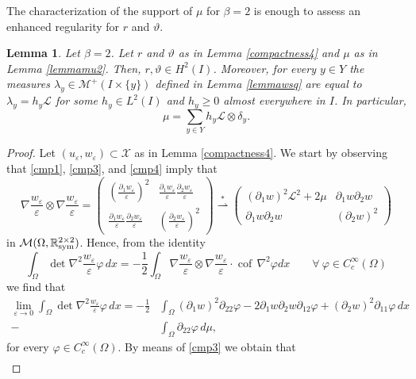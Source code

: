 \documentclass[a4, 11pt, reqno, final]{amsart}
\newcommand{\calL}{\mathcal{L}}
\newcommand{\calM}{\mathcal{M}}
\newcommand{\calX}{\mathcal{X}}
\newcommand\e{\varepsilon}
\newcommand\weakstar{\stackrel{\ast }{\rightharpoonup}}  %
\theoremstyle{plain}%
\newtheorem{lemma}[theorem]{Lemma}
\DeclareMathOperator{\cof}{cof\,}
\begin{document}
	The characterization of the support of $\mu$ for $\beta=2$ is enough to assess an enhanced regularity for $r$ and $\vartheta$.
	\begin{lemma}\label{rtH2}
		Let $\beta=2$. Let $r$ and $\vartheta$ as in Lemma \ref{compactness4} and $\mu$ as in Lemma \ref{lemmamu2}. Then, $r, \vartheta \in H^2(I)$.
		Moreover, for every $y\in Y$  the measures $\lambda_y \in \calM^+(I\times \{y\})$ defined in Lemma \ref{lemmawsq} are equal to $\lambda_y=h_y\calL$ for some $h_y\in L^2(I)$ and $h_y\ge 0$ almost everywhere in $I$.
		In particular,
		\begin{equation}\label{muh}
			\mu = \sum_{y\in Y} h_y\calL\otimes \delta_y.
		\end{equation}
	\end{lemma}

	\begin{proof}
		Let $(u_\e, w_{\e})\subset \calX$ as in Lemma \ref{compactness4}.
		We start by observing that \eqref{cmp1},  \eqref{cmp3}, and  \eqref{cmp4}
		imply that
		$$
		\nabla \frac{w_\e}{\e}\otimes \nabla \frac{w_\e}{\e}=
		\begin{pmatrix}
			(\frac{\partial_1 w_\e}{\e})^2 & \frac{\partial_1 w_\e}{\e}\frac{\partial_2 w_\e}{\e}\\
			\frac{\partial_1 w_\e}{\e}\frac{\partial_2 w_\e}{\e} & (\frac{\partial_2 w_\e}{\e})^2
		\end{pmatrix}
		\weakstar
		\begin{pmatrix}
			(\partial_1 w)^2\calL^2+2\mu & \partial_1 w\partial_2 w\\
			\partial_1 w\partial_2 w & (\partial_2 w)^2
		\end{pmatrix}
		$$
		in $\calM(\Omega, \mathbb{R}^{2\times 2}_{\rm sym})$.
		Hence, from the identity
		$$
		\int_\Omega \det \nabla^2 \frac{w_\e}{\e} \varphi \, dx =-\frac12\int_\Omega  \nabla \frac{w_\e}{\e}\otimes \nabla \frac{w_\e}{\e} \cdot \cof\nabla^2\varphi dx \qquad \forall  \ \varphi \in C_c^\infty(\Omega)
		$$
		we find that
		$$
		\begin{aligned}
		\lim_{\e\to 0}		\int_\Omega \det \nabla^2 \frac{w_\e}{\e} \varphi \, dx =-\frac12&\int_\Omega (\partial_1 w)^2\partial_{22}\varphi-2 \partial_1 w\partial_2 w\partial_{12}\varphi+(\partial_2 w)^2 \partial_{11}\varphi\, dx\\-&\int_\Omega \partial_{22}\varphi\,d\mu,
				\end{aligned}
		$$
		for every $\varphi \in C_c^\infty(\Omega)$. By means of \eqref{cmp3} we obtain  that
		$$
		\begin{aligned}

\end{aligned}$$
\end{proof}
\end{document}

